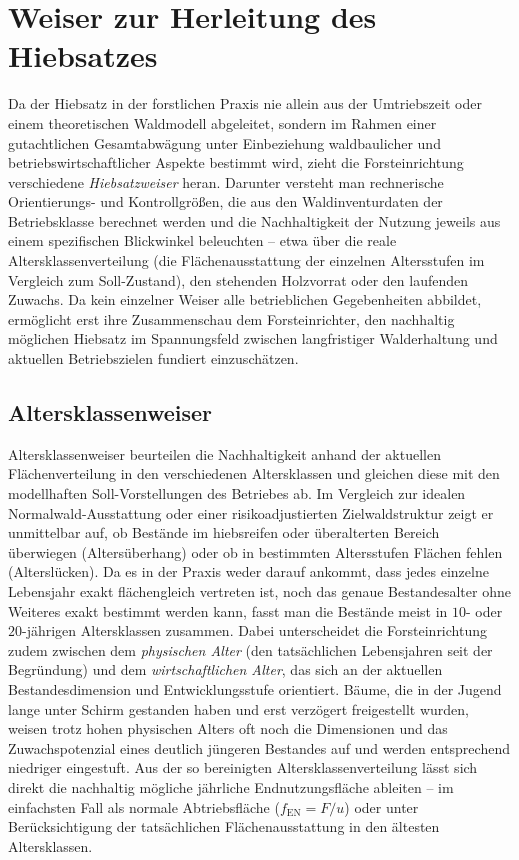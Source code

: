 \documentclass[twocolumn, paper=a4, fontsize=10pt]{scrartcl}
\begin{document}
\section{Weiser zur Herleitung des Hiebsatzes}

Da der Hiebsatz in der forstlichen Praxis nie allein aus der Umtriebszeit oder einem theoretischen Waldmodell abgeleitet, sondern im Rahmen einer gutachtlichen Gesamtabwägung unter Einbeziehung waldbaulicher und betriebswirtschaftlicher Aspekte bestimmt wird, zieht die Forsteinrichtung verschiedene \emph{Hiebsatzweiser} heran. Darunter versteht man rechnerische Orientierungs- und Kontrollgrößen, die aus den Waldinventurdaten der Betriebsklasse berechnet werden und die Nachhaltigkeit der Nutzung jeweils aus einem spezifischen Blickwinkel beleuchten -- etwa über die reale Altersklassenverteilung (die Flächenausstattung der einzelnen Altersstufen im Vergleich zum Soll-Zustand), den stehenden Holzvorrat oder den laufenden Zuwachs. Da kein einzelner Weiser alle betrieblichen Gegebenheiten abbildet, ermöglicht erst ihre Zusammenschau dem Forsteinrichter, den nachhaltig möglichen Hiebsatz im Spannungsfeld zwischen langfristiger Walderhaltung und aktuellen Betriebszielen fundiert einzuschätzen.

\subsection{Altersklassenweiser}

Altersklassenweiser beurteilen die Nachhaltigkeit anhand der aktuellen Flächenverteilung in den verschiedenen Altersklassen und gleichen diese mit den modellhaften Soll-Vorstellungen des Betriebes ab. Im Vergleich zur idealen Normalwald-Ausstattung oder einer risikoadjustierten Zielwaldstruktur zeigt er unmittelbar auf, ob Bestände im hiebsreifen oder überalterten Bereich überwiegen (Altersüberhang) oder ob in bestimmten Altersstufen Flächen fehlen (Alterslücken). Da es in der Praxis weder darauf ankommt, dass jedes einzelne Lebensjahr exakt flächengleich vertreten ist, noch das genaue Bestandesalter ohne Weiteres exakt bestimmt werden kann, fasst man die Bestände meist in $10$- oder $20$-jährigen Altersklassen zusammen. Dabei unterscheidet die Forsteinrichtung zudem zwischen dem \emph{physischen Alter} (den tatsächlichen Lebensjahren seit der Begründung) und dem \emph{wirtschaftlichen Alter}, das sich an der aktuellen Bestandesdimension und Entwicklungsstufe orientiert. Bäume, die in der Jugend lange unter Schirm gestanden haben und erst verzögert freigestellt wurden, weisen trotz hohen physischen Alters oft noch die Dimensionen und das Zuwachspotenzial eines deutlich jüngeren Bestandes auf und werden entsprechend niedriger eingestuft. Aus der so bereinigten Altersklassenverteilung lässt sich direkt die nachhaltig mögliche jährliche Endnutzungsfläche ableiten -- im einfachsten Fall als normale Abtriebsfläche ($f_{\text{EN}} = F/u$) oder unter Berücksichtigung der tatsächlichen Flächenausstattung in den ältesten Altersklassen.
\end{document}
